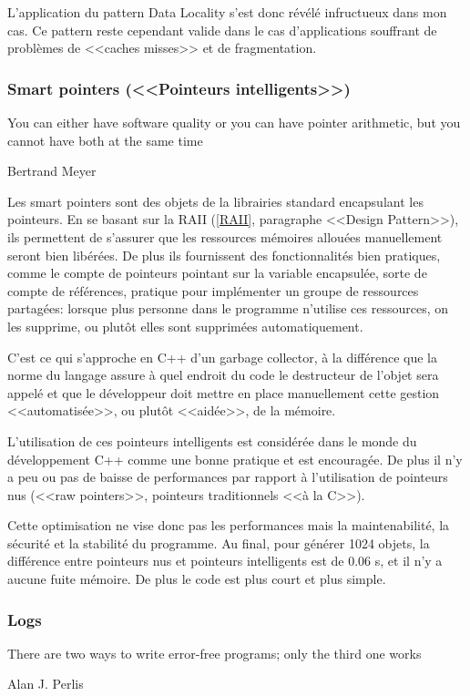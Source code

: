 \documentclass[a4paper,french,12pt]{article}
\begin{document}
	L'application du pattern Data Locality s'est donc révélé infructueux dans mon cas. Ce pattern reste cependant valide
	dans le cas d'applications souffrant de problèmes de <<caches misses>> et de fragmentation.
	
      \subsubsection{Smart pointers (<<Pointeurs intelligents>>)}
	\epigraph{You can either have software quality or you can have pointer arithmetic, but you cannot have both at the same time}{Bertrand Meyer}
	
  
	Les smart pointers sont des objets de la librairies standard encapsulant les pointeurs.
	En se basant sur la RAII (\ref{RAII}, paragraphe <<Design Pattern>>), ils permettent de s'assurer que les ressources mémoires allouées manuellement
	seront bien libérées.
	De plus ils fournissent des fonctionnalités bien pratiques, comme le compte de pointeurs pointant sur la variable encapsulée,
	 sorte de compte de références, pratique pour implémenter un groupe de ressources partagées: lorsque plus personne
	 dans le programme n'utilise ces ressources, on les supprime, ou plutôt elles sont supprimées automatiquement.
	 
	C'est ce qui s'approche en C++ d'un garbage collector, à la différence que la norme du langage assure
	à quel endroit du code le destructeur de l'objet sera appelé et que le développeur doit mettre en place manuellement
	cette gestion <<automatisée>>, ou plutôt <<aidée>>,  de la mémoire.
	 
	L'utilisation de ces pointeurs intelligents est considérée dans le monde du développement C++ comme une bonne 
	pratique et est encouragée. De plus il n'y a peu ou pas de baisse de performances par rapport à l'utilisation
	de pointeurs nus (<<raw pointers>>, pointeurs traditionnels <<à la C>>).
	
	Cette optimisation ne vise donc pas les performances mais la maintenabilité, la sécurité et la stabilité du programme.
	Au final, pour générer 1024 objets, la différence entre pointeurs nus et pointeurs intelligents est de 0.06 s,
	et il n'y a aucune fuite mémoire. De plus le code est plus court et plus simple.
	

      \subsubsection{Logs}
	\epigraph{There are two ways to write error-free programs; only the third one works}{Alan J. Perlis}
      
\end{document}
